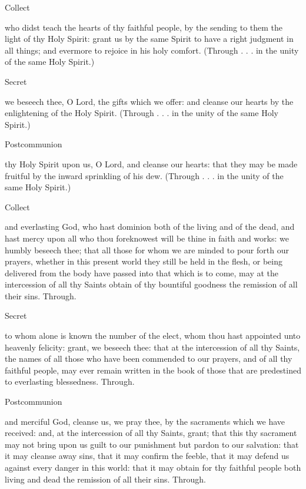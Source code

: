    \label{SPHolyGhost}
   \begin{inhead}
   	Collect
   \end{inhead}
    who didst teach the hearts of thy faithful people, by the sending to them the light of thy Holy Spirit: grant us by the same Spirit to have a right judgment in all things; and evermore to rejoice in his holy comfort. (Through . . . in the unity of the same Holy Spirit.)
  \begin{inhead}
  	Secret
  \end{inhead}
    we beseech thee, O Lord, the gifts which we offer: and cleanse our hearts by the enlightening of the Holy Spirit. (Through . . . in the unity of the same Holy Spirit.)
   \begin{inhead}
   	Postcommunion
   \end{inhead}
    thy Holy Spirit upon us, O Lord, and cleanse our hearts: that they may be made fruitful by the inward sprinkling of his dew. (Through . . . in the unity of the same Holy Spirit.)

    \label{SPLivingDeparted}
   \begin{inhead}
   	Collect
   \end{inhead}
    and everlasting God, who hast dominion both of the living and of the dead, and hast mercy upon all who thou foreknowest will be thine in faith and works: we humbly beseech thee; that all those for whom we are minded to pour forth our prayers, whether in this present world they still be held in the flesh, or being delivered from the body have passed into that which is to come, may at the intercession of all thy Saints obtain of thy bountiful goodness the remission of all their sins. Through.
  \begin{inhead}
  	Secret
  \end{inhead}
    to whom alone is known the number of the elect, whom thou hast appointed unto heavenly felicity: grant, we beseech thee: that at the intercession of all thy Saints, the names of all those who have been commended to our prayers, and of all thy faithful people, may ever remain written in the book of those that are predestined to everlasting blessedness. Through.
   \begin{inhead}
   	Postcommunion
   \end{inhead}
    and merciful God, cleanse us, we pray thee, by the sacraments which we have received: and, at the intercession of all thy Saints, grant; that this thy sacrament may not bring upon us guilt to our punishment but pardon to our salvation: that it may cleanse away sins, that it may confirm the feeble, that it may defend us against every danger in this world: that it may obtain for thy faithful people both living and dead the remission of all their sins. Through.